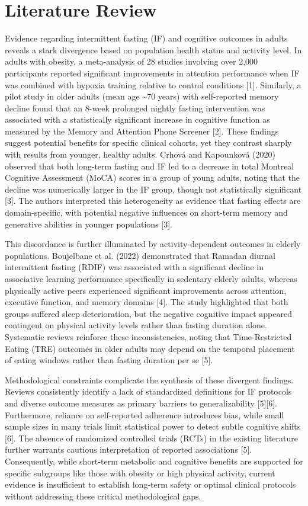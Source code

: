 \documentclass[conference]{IEEEtran}
\begin{document}
\section{Literature Review}
Evidence regarding intermittent fasting (IF) and cognitive outcomes in adults reveals a stark divergence based on population health status and activity level. In adults with obesity, a meta-analysis of 28 studies involving over 2,000 participants reported significant improvements in attention performance when IF was combined with hypoxia training relative to control conditions [1]. Similarly, a pilot study in older adults (mean age \textasciitilde{}70 years) with self-reported memory decline found that an 8-week prolonged nightly fasting intervention was associated with a statistically significant increase in cognitive function as measured by the Memory and Attention Phone Screener [2]. These findings suggest potential benefits for specific clinical cohorts, yet they contrast sharply with results from younger, healthy adults. Crhová and Kapounková (2020) observed that both long-term fasting and IF led to a decrease in total Montreal Cognitive Assessment (MoCA) scores in a group of young adults, noting that the decline was numerically larger in the IF group, though not statistically significant [3]. The authors interpreted this heterogeneity as evidence that fasting effects are domain-specific, with potential negative influences on short-term memory and generative abilities in younger populations [3].

This discordance is further illuminated by activity-dependent outcomes in elderly populations. Boujelbane et al. (2022) demonstrated that Ramadan diurnal intermittent fasting (RDIF) was associated with a significant decline in associative learning performance specifically in sedentary elderly adults, whereas physically active peers experienced significant improvements across attention, executive function, and memory domains [4]. The study highlighted that both groups suffered sleep deterioration, but the negative cognitive impact appeared contingent on physical activity levels rather than fasting duration alone. Systematic reviews reinforce these inconsistencies, noting that Time-Restricted Eating (TRE) outcomes in older adults may depend on the temporal placement of eating windows rather than fasting duration per se [5].

Methodological constraints complicate the synthesis of these divergent findings. Reviews consistently identify a lack of standardized definitions for IF protocols and diverse outcome measures as primary barriers to generalizability [5][6]. Furthermore, reliance on self-reported adherence introduces bias, while small sample sizes in many trials limit statistical power to detect subtle cognitive shifts [6]. The absence of randomized controlled trials (RCTs) in the existing literature further warrants cautious interpretation of reported associations [5]. Consequently, while short-term metabolic and cognitive benefits are supported for specific subgroups like those with obesity or high physical activity, current evidence is insufficient to establish long-term safety or optimal clinical protocols without addressing these critical methodological gaps.
\end{document}
